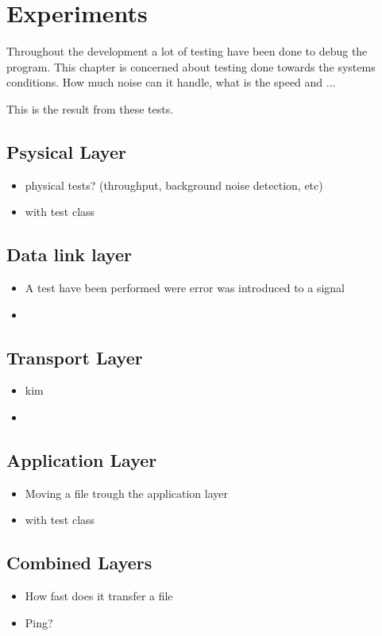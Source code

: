 \chapter{Experiments}\label{chap:experiments}
Throughout the development a lot of testing have been done to debug the program. This chapter is concerned about testing done towards the systems conditions. How much noise can it handle, what is the speed and ... 

This is the result from these tests.


\section{Psysical Layer}

\begin{itemize}
\item physical tests? (throughput, background noise detection, etc)
\item with test class
\end{itemize}

\section{Data link layer}

\begin{itemize}
\item A test have been performed were error was introduced to a signal
\item 
\end{itemize}

\section{Transport Layer}

\begin{itemize}
\item kim
\item 
\end{itemize}

\section{Application Layer}

\begin{itemize}
\item Moving a file trough the application layer
\item with test class
\end{itemize}

\section{Combined Layers}

\begin{itemize}
\item How fast does it transfer a file
\item Ping?
\end{itemize}
